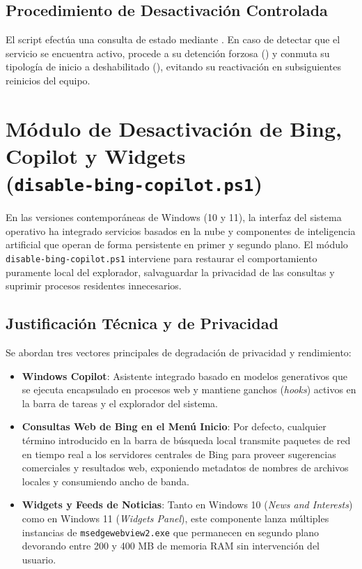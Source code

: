 \documentclass[12pt,a4paper]{report}
\begin{document}
\subsection{Procedimiento de Desactivación Controlada}
El script efectúa una consulta de estado mediante . En caso de detectar que el servicio se encuentra activo, procede a su detención forzosa () y conmuta su tipología de inicio a deshabilitado (), evitando su reactivación en subsiguientes reinicios del equipo.

\section[Módulo de Bing, Copilot y Widgets]{Módulo de Desactivación de Bing, Copilot y Widgets\\ \large(\texttt{disable-bing-copilot.ps1})}
En las versiones contemporáneas de Windows (10 y 11), la interfaz del sistema operativo ha integrado servicios basados en la nube y componentes de inteligencia artificial que operan de forma persistente en primer y segundo plano. El módulo \texttt{disable-bing-copilot.ps1} interviene para restaurar el comportamiento puramente local del explorador, salvaguardar la privacidad de las consultas y suprimir procesos residentes innecesarios.

\subsection{Justificación Técnica y de Privacidad}
Se abordan tres vectores principales de degradación de privacidad y rendimiento:
\begin{itemize}
    \item \textbf{Windows Copilot}: Asistente integrado basado en modelos generativos que se ejecuta encapsulado en procesos web y mantiene ganchos (\textit{hooks}) activos en la barra de tareas y el explorador del sistema.
    \item \textbf{Consultas Web de Bing en el Menú Inicio}: Por defecto, cualquier término introducido en la barra de búsqueda local transmite paquetes de red en tiempo real a los servidores centrales de Bing para proveer sugerencias comerciales y resultados web, exponiendo metadatos de nombres de archivos locales y consumiendo ancho de banda.
    \item \textbf{Widgets y Feeds de Noticias}: Tanto en Windows 10 (\textit{News and Interests}) como en Windows 11 (\textit{Widgets Panel}), este componente lanza múltiples instancias de \texttt{msedgewebview2.exe} que permanecen en segundo plano devorando entre 200 y 400 MB de memoria RAM sin intervención del usuario.
\end{itemize}
\end{document}
